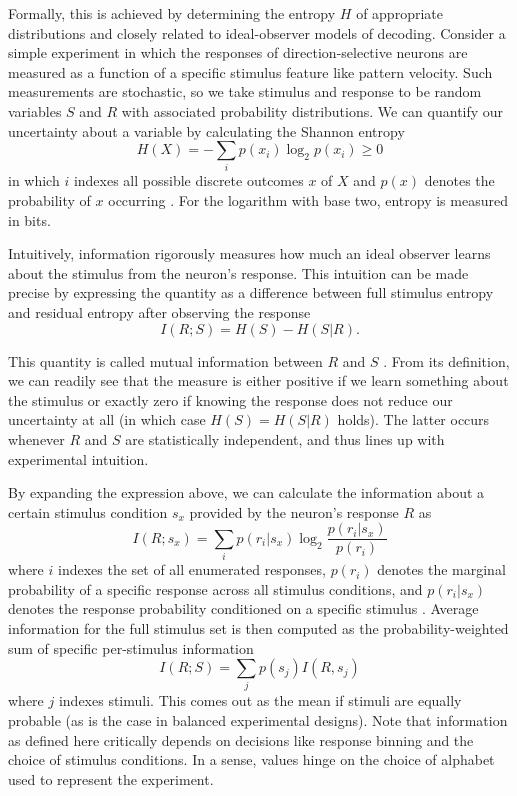 Formally, this is achieved by determining the entropy $H$ of appropriate distributions and closely related to ideal-observer models of decoding. Consider a simple experiment in which the responses of direction-selective neurons are measured as a function of a specific stimulus feature like pattern velocity. Such measurements are stochastic, so we take stimulus and response to be random variables $S$ and $R$ with associated probability distributions. We can quantify our uncertainty about a variable by calculating the Shannon entropy
\begin{equation}
    H(X) = - \sum_{i} p(x_i) \log_2 p(x_i) \geq 0
\end{equation}
in which $i$ indexes all possible discrete outcomes $x$ of $X$ and $p(x)$ denotes the probability of $x$ occurring \citep{Cover:2006aa}. For the logarithm with base two, entropy is measured in bits.

Intuitively, information rigorously measures how much an ideal observer learns about the stimulus from the neuron's response. This intuition can be made precise by expressing the quantity as a difference between full stimulus entropy and residual entropy after observing the response
\begin{equation}
    I(R; S) = H(S) - H(S|R).
\end{equation}

This quantity is called mutual information between $R$ and $S$ \citep{Cover:2006aa}. From its definition, we can readily see that the measure is either positive if we learn something about the stimulus or exactly zero if knowing the response does not reduce our uncertainty at all (in which case $H(S) = H(S|R)$ holds). The latter occurs whenever $R$ and $S$ are statistically independent, and thus lines up with experimental intuition.

By expanding the expression above, we can calculate the information about a certain stimulus condition $s_x$ provided by the neuron's response $R$ as
\begin{equation}
    I(R; s_x) = \sum_{i} p(r_i | s_x) \log_2 \frac{p(r_i | s_x)}{p(r_i)}
\end{equation}
where $i$ indexes the set of all enumerated responses, $p(r_i)$ denotes the marginal probability of a specific response across all stimulus conditions, and $p(r_i | s_x)$ denotes the response probability conditioned on a specific stimulus \citep{Borst:1999hw}. Average information for the full stimulus set is then computed as the probability-weighted sum of specific per-stimulus information
\begin{equation}
    I(R; S) = \sum_{j} p(s_j) I(R, s_j)
\end{equation}
where $j$ indexes stimuli. This comes out as the mean if stimuli are equally probable (as is the case in balanced experimental designs). Note that information as defined here critically depends on decisions like response binning and the choice of stimulus conditions. In a sense, values hinge on the choice of alphabet used to represent the experiment.

